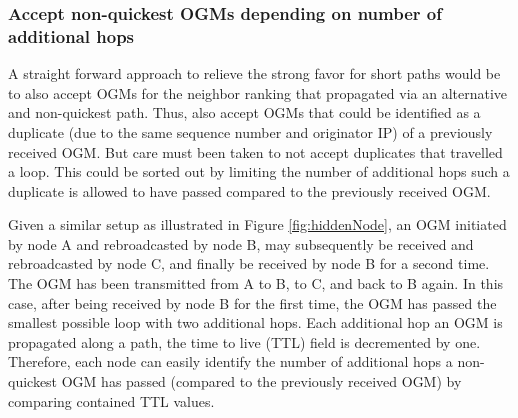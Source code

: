 \documentclass[11pt]{article}
\begin{document}
\subsubsection{Accept non-quickest OGMs depending on number of additional hops}





A straight forward approach to relieve the strong favor for short paths would be to also accept OGMs for the neighbor ranking that propagated via an alternative and non-quickest path.
%
Thus, also accept OGMs that could be identified as a duplicate (due to the same sequence number and originator IP) of a previously received OGM.
%
But care must been taken to not accept duplicates that travelled a loop.
%
This could be sorted out by limiting the number of additional hops such a duplicate is allowed to have passed compared to the previously received OGM.
%

Given a similar setup as illustrated in Figure \ref{fig:hiddenNode}, an OGM initiated by node A and rebroadcasted by node B, may subsequently be received and rebroadcasted by node C, and finally be received by node B for a second time.
%
The OGM has been transmitted from A to B, to C, and back to B again.
%
In this case, after being received by node B for the first time, the OGM has passed the smallest possible loop with two additional hops.
%
Each additional hop an OGM is propagated along a path, the time to live (TTL) field is decremented by one.
%
Therefore, each node can easily identify the number of additional hops a non-quickest OGM has passed (compared to the previously received OGM) by comparing contained TTL values.
\end{document}
